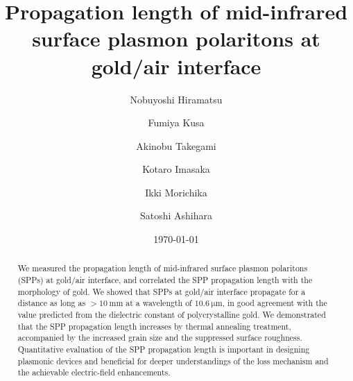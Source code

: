 \documentclass[aip,apl,reprint]{revtex4-1}
\begin{document}
\title{Propagation length of mid-infrared surface plasmon polaritons at gold/air interface}
\author{Nobuyoshi Hiramatsu}
\author{Fumiya Kusa}
\author{Akinobu Takegami}
\author{Kotaro Imasaka}
\author{Ikki Morichika}
\author{Satoshi Ashihara}

\date{\today}

\begin{abstract}
We measured the propagation length of mid-infrared surface plasmon polaritons (SPPs) at gold/air interface, and correlated the SPP propagation length with the morphology of gold. We showed that SPPs at gold/air interface propagate for a distance as long as $>10\:\mathrm{mm}$ at a wavelength of $10.6\:\mathrm{\mu m}$, in good agreement with the value predicted from the dielectric constant of polycrystalline gold. We demonstrated that the SPP propagation length increases by thermal annealing treatment, accompanied by the increased grain size and the suppressed surface roughness. Quantitative evaluation of the SPP propagation length is important in designing plasmonic devices and beneficial for deeper understandings of the loss mechanism and the achievable electric-field enhancements.
\end{abstract}

\maketitle
 
\end{document}

